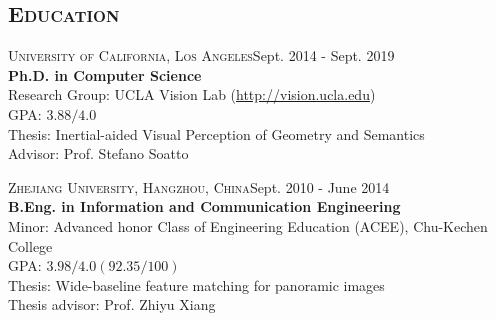 \documentclass[margin, line, 10pt]{res} %
\begin{document}
\begin{resume}

\section{\textsc{Education}}
\textsc{University of California, Los Angeles}\hfill{Sept. 2014 - Sept. 2019}\\
{\bf Ph.D. in Computer Science}\\
Research Group: UCLA Vision Lab (\url{http://vision.ucla.edu})\\
GPA: $3.88/4.0$ \\
Thesis: Inertial-aided Visual Perception of Geometry and Semantics \\
Advisor: Prof. Stefano Soatto

\textsc{Zhejiang University, Hangzhou, China}\hfill{Sept. 2010 - June 2014}\\
{\bf B.Eng. in Information and Communication Engineering}\\
Minor: Advanced honor Class of Engineering Education (ACEE), Chu-Kechen College\\
GPA: $3.98/4.0 (92.35/100)$ \\
Thesis: Wide-baseline feature matching for panoramic images\\
Thesis advisor: Prof. Zhiyu Xiang\\





\end{resume}
\end{document}

